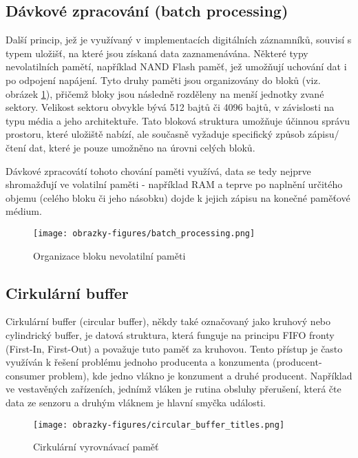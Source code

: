 \subsection{Dávkové zpracování (batch processing)}
Další princip, jež je využívaný v implementacích digitálních záznamníků, souvisí s typem uložišť, na které jsou získaná data 
zaznamenávána. Některé typy nevolatilních pamětí, například NAND Flash paměť, jež umožňují uchování dat i po odpojení napájení. 
Tyto druhy paměti jsou organizovány do bloků (viz. obrázek \ref{fig:batch-processing}), přičemž bloky jsou následně rozděleny na 
menší jednotky zvané sektory. Velikost sektoru obvykle bývá 512 bajtů či 4096 bajtů, v závislosti na typu média a jeho architektuře. Tato bloková struktura umožňuje účinnou správu prostoru, které uložiště nabízí, ale současně vyžaduje specifický způsob zápisu/čtení dat, které je pouze umožněno na úrovni celých bloků.  \cite{tech_target_nand_flash, non_volatile_memories}

Dávkové zpracovátí tohoto chování paměti využívá, data se tedy nejprve shromažďují ve volatilní paměti - například RAM a teprve po 
naplnění určitého objemu (celého bloku či jeho násobku) dojde k jejich zápisu na konečné paměťové médium.

\begin{figure}[h]
    \centering
    \texttt{[image: obrazky-figures/batch\_processing.png]}
    
    \caption{Organizace bloku nevolatilní paměti \cite{ieee_relationships_among_region_segment_frame_and_cluster}}
    \label{fig:batch-processing}
\end{figure}


\subsection{Cirkulární buffer}
Cirkulární buffer (circular buffer), někdy také označovaný jako kruhový nebo cylindrický buffer, je datová struktura, která 
funguje na principu FIFO fronty (First-In, First-Out) a považuje tuto paměť za kruhovou. Tento přístup je často využíván k řešení 
problému jednoho producenta a konzumenta (producent-consumer problem), kde jedno vlákno je konzument a druhé producent. Například 
ve vestavěných zařízeních, jednímž vláken je rutina obsluhy přerušení, která čte data ze senzoru a druhým vláknem je hlavní smyčka 
události.  \cite{embedjournal_ring_buffer}


\begin{figure}[h]
    \centering
    \texttt{[image: obrazky-figures/circular\_buffer\_titles.png]}
    
    \caption{Cirkulární vyrovnávací paměť}
    \label{fig:circular-buffer}
\end{figure}

